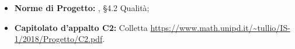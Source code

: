 \begin{itemize}
	\item \textbf{Norme di Progetto:} \NdP, §4.2 Qualità;
	\item \textbf{Capitolato d'appalto C2: } Colletta \newline
		  \url{https://www.math.unipd.it/~tullio/IS-1/2018/Progetto/C2.pdf}.
\end{itemize}